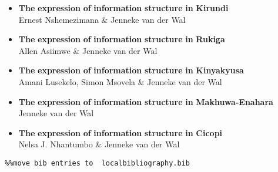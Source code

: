 \documentclass[output=paper]{langscibook}
\begin{document}
\begin{itemize}
\item \begin{styleListParagraph}
\textbf{The} \textbf{expression} \textbf{of} \textbf{information} \textbf{structure} \textbf{in} \textbf{Kirundi\\
}Ernest Nshemezimana \& Jenneke van der Wal
\end{styleListParagraph}
\end{itemize}
\begin{itemize}
\item \begin{styleListParagraph}
\textbf{The} \textbf{expression} \textbf{of} \textbf{information} \textbf{structure} \textbf{in} \textbf{Rukiga\\
}Allen Asiimwe \& Jenneke van der Wal
\end{styleListParagraph}
\end{itemize}
\begin{itemize}
\item \begin{styleListParagraph}
\textbf{The} \textbf{expression} \textbf{of} \textbf{information} \textbf{structure} \textbf{in} \textbf{Kinyakyusa\\
}Amani Lusekelo, Simon Msovela \& Jenneke van der Wal
\end{styleListParagraph}
\end{itemize}
\begin{itemize}
\item \begin{styleListParagraph}
\textbf{The} \textbf{expression} \textbf{of} \textbf{information} \textbf{structure} \textbf{in} \textbf{Makhuwa-Enahara\\
}Jenneke van der Wal
\end{styleListParagraph}
\end{itemize}
\begin{itemize}
\item \begin{styleListParagraph}
\textbf{The} \textbf{expression} \textbf{of} \textbf{information} \textbf{structure} \textbf{in} \textbf{Cicopi\\
}Nelsa J. Nhantumbo \& Jenneke van der Wal
\end{styleListParagraph}
\end{itemize}

\begin{verbatim}%%move bib entries to  localbibliography.bib
\end{verbatim}
\sloppy\printbibliography[heading=subbibliography,notkeyword=this]
\end{document}
